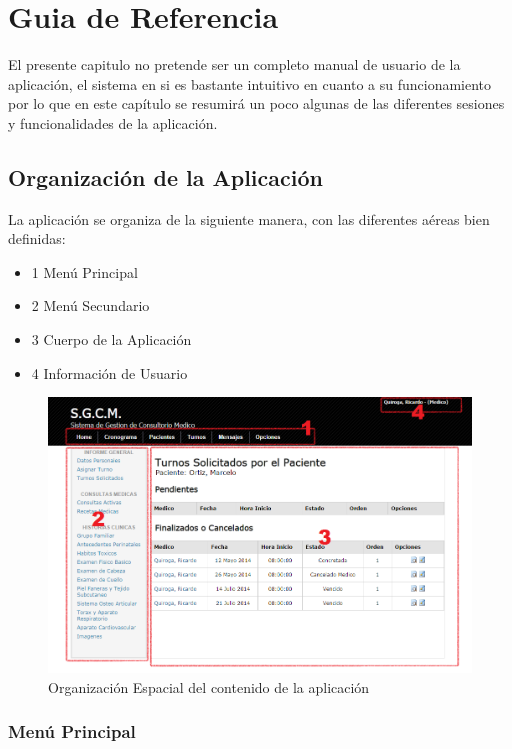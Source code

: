 ﻿\chapter{Guia de Referencia}

El presente capitulo no pretende ser un completo manual de usuario de la aplicación, el sistema en si es bastante intuitivo en cuanto a su funcionamiento por lo que en este capítulo se resumirá un poco algunas de las diferentes sesiones y funcionalidades de la aplicación.

\section{Organización de la Aplicación}

La aplicación se organiza de la siguiente manera, con las diferentes aéreas bien definidas:

\begin{itemize}
    \item 1 Menú Principal
    \item 2 Menú Secundario
    \item 3 Cuerpo de la Aplicación
    \item 4 Información de Usuario
\end{itemize}

\begin{figure}[H]
    \centering
    \includegraphics[scale=0.5]{resourse/organizacion.png}
    \caption{Organización Espacial del contenido de la aplicación}
    \label{fig:61}
\end{figure}


\subsection{Menú Principal}

